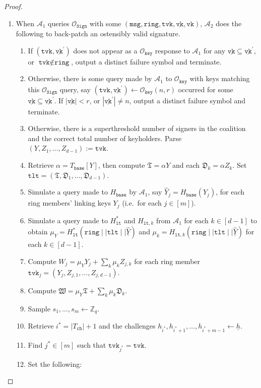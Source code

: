 \documentclass[11pt]{article}
\theoremstyle{definition}
\newcommand{\vk}{\texttt{vk}}
\newcommand{\lt}{\texttt{lt}}
\newcommand{\tlt}{\texttt{tlt}}
\newcommand{\tvk}{\texttt{tvk}}
\newcommand{\ring}{\texttt{ring}}
\newcommand{\VK}{\underline{\texttt{vk}}}
\newcommand{\Zq}{\mathbb{Z}_q}
\newcommand{\msg}{\texttt{msg}}
\newcommand{\sign}{\texttt{Sign}}
\newcommand{\signingOracle}{\mathcal{O}_{\sign}}
\newcommand{\keyOracle}{\mathcal{O}_{\texttt{key}}}
\begin{document}
\begin{proof}
\begin{enumerate}
\begin{enumerate}
\item When $\mathcal{A}_1$ queries $\signingOracle$ with some $(\msg, \ring, \tvk, \VK, \vk)$, $\mathcal{A}_2$ does the following to back-patch an ostensibly valid signature.
\begin{enumerate}
\item If $(\tvk, \VK^\prime)$ does not appear as a $\keyOracle$ response to $\mathcal{A}_1$ for any $\VK \subseteq \VK^\prime$, or $\tvk \notin \ring$, output a distinct failure symbol and terminate.
\item Otherwise, there is some query made by $\mathcal{A}_1$ to $\keyOracle$ with keys matching this $\signingOracle$ query, say $(\tvk, \VK^\prime) \leftarrow \keyOracle(n,r)$ occurred for some $\VK \subseteq \VK^\prime$. If $\left|\VK\right| < r$, or $\left|\VK^\prime\right| \neq n$, output a distinct failure symbol and terminate.  
\item Otherwise, there is a superthreshold number of signers in the coalition and the correct total number of keyholders. Parse $(Y, Z_1, \ldots, Z_{d-1}) := \tvk$.
\item Retrieve $\alpha = T_{\texttt{base}}[Y]$, then compute $\mathfrak{T} = \alpha Y$ and each $\mathfrak{D}_k = \alpha Z_k$. Set $\tlt = (\mathfrak{T}, \mathfrak{D}_1, \ldots, \mathfrak{D}_{d-1})$.
\item Simulate a query made to $H_{\texttt{base}}$ by $\mathcal{A}_1$, say $\widehat{Y}_j = H_{\texttt{base}}(Y_j)$, for each ring members' linking keys $Y_j$ (i.e.\ for each $j \in [m]$).
\item Simulate a query made to $H_{\lt}^*$ and $H_{\lt, k}$ from $\mathcal{A}_1$ for each $k \in [d-1]$ to obtain $\mu_Y = H_{\lt}^*(\ring \mid \mid \tlt \mid \mid \underline{\widehat{Y}})$ and $\mu_k = H_{\lt, k}(\ring \mid \mid \tlt \mid \mid \underline{\widehat{Y}})$ for each $k \in [d-1]$.
\item Compute $W_j = \mu_Y Y_j + \sum_k \mu_k Z_{j,k}$ for each ring member $\tvk_j = (Y_j, Z_{j,1}, \ldots, Z_{j,d-1})$.
\item Compute $\mathfrak{W} = \mu_Y \mathfrak{T} + \sum_k \mu_k \mathfrak{D}_k$.
\item Sample $s_1, \ldots, s_m \leftarrow \Zq$.
\item Retrieve $i^* = \left|T_{\texttt{ch}}\right| + 1$ and the challenges $h_{i^*}, h_{i^*+1}, \ldots, h_{i^*+m-1} \leftarrow \underline{h}$.
\item Find $j^* \in [m]$ such that $\tvk_{j^*} = \tvk$.
\item Set the following:

\end{enumerate}
\end{enumerate}
\end{enumerate}
\end{proof}
\end{document}
